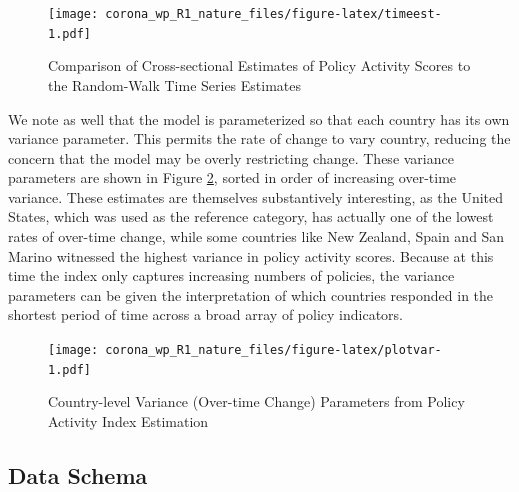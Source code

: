 \documentclass[
]{article}
\begin{document}
\begin{figure}
\centering
\texttt{[image: corona\_wp\_R1\_nature\_files/figure-latex/timeest-1.pdf]}
\caption{\label{fig:timeest}Comparison of Cross-sectional Estimates of Policy Activity Scores to the Random-Walk Time Series Estimates}
\end{figure}

We note as well that the model is parameterized so that each country has its own variance parameter. This permits the rate of change to vary country, reducing the concern that the model may be overly restricting change. These variance parameters are shown in Figure \ref{fig:plotvar}, sorted in order of increasing over-time variance. These estimates are themselves substantively interesting, as the United States, which was used as the reference category, has actually one of the lowest rates of over-time change, while some countries like New Zealand, Spain and San Marino witnessed the highest variance in policy activity scores. Because at this time the index only captures increasing numbers of policies, the variance parameters can be given the interpretation of which countries responded in the shortest period of time across a broad array of policy indicators.

\begin{figure}
\centering
\texttt{[image: corona\_wp\_R1\_nature\_files/figure-latex/plotvar-1.pdf]}
\caption{\label{fig:plotvar}Country-level Variance (Over-time Change) Parameters from Policy Activity Index Estimation}
\end{figure}

\hypertarget{data-schema}{%
\subsection*{Data Schema}\label{data-schema}}
\end{document}

